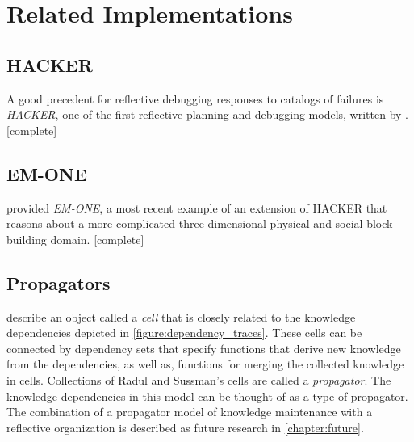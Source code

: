 \chapter{Related Implementations}
\label{chapter:related_implementations}

\section{HACKER}

A good precedent for reflective debugging responses to catalogs of
failures is \emph{HACKER}, one of the first reflective planning and
debugging models, written by \cite{sussman:1973}.  [complete]

\section{EM-ONE}

\cite{singh:2005b} provided \emph{EM-ONE}, a most recent example of an
extension of HACKER that reasons about a more complicated
three-dimensional physical and social block building domain.
[complete]

\section{Propagators}

\cite{radul_and_sussman:2009} describe an object called a \emph{cell}
that is closely related to the knowledge dependencies depicted in
{\mbox{\autoref{figure:dependency_traces}}}.  These cells can be
connected by dependency sets that specify functions that derive new
knowledge from the dependencies, as well as, functions for merging the
collected knowledge in cells.  Collections of Radul and Sussman's
cells are called a \emph{propagator}.  The knowledge dependencies in
this model can be thought of as a type of propagator.  The combination
of a propagator model of knowledge maintenance with a reflective
organization is described as future research in
\autoref{chapter:future}.
